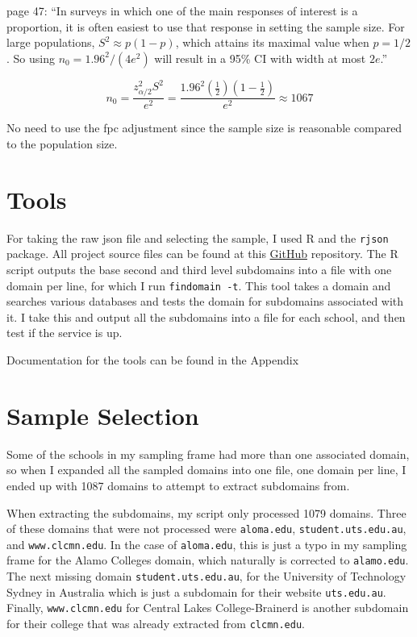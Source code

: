 \documentclass{article}
\theoremstyle{definition}
\begin{document}
\begin{flushleft}
\cite{lohr2019} page 47:
``In surveys in which one of the main responses of interest
is a proportion, it is often easiest to use that response
in setting the sample size.
For large populations, $S^2 \approx p(1-p)$, which
attains its maximal value when $p=1/2$. So using
$n_0=1.96^2/(4e^2)$ will result in a 95\% CI with width at most
$2e$.''

$$
	n_0
	=
	\frac{
		z^2_{\alpha/2}S^2
	}{
		e^2
	}
	=
	\frac{
		1.96^2(\frac{1}{2})(1-\frac{1}{2})
	}{
		e^2
	}
	\approx
	1067
$$

No need to use the fpc adjustment since the sample size
is reasonable compared to the population size.

\section{Tools} \label{sec:tools}
For taking the raw json file and selecting the sample, I used R and the \texttt{rjson}
package. All project source files can be found at this
\href{https://github.com/chrissobczak/os-survey}{GitHub} repository.
The R script outputs the base second and third level subdomains
into a file with one domain per line, for which I run \texttt{findomain -t}.
This tool takes a domain and searches various databases and tests the domain
for subdomains associated with it. I take this and output all the subdomains
into a file for each school, and then test if the service is up.

Documentation for the tools can be found in the Appendix

\section{Sample Selection}
Some of the schools in my sampling frame had more than one associated
domain, so when I expanded all the sampled domains into one file, one
domain per line, I ended up with 1087 domains to attempt to extract
subdomains from.

When extracting the subdomains, my script only processed 1079 domains.
Three of these domains that were not processed were \texttt{aloma.edu},
\texttt{student.uts.edu.au}, and \texttt{www.clcmn.edu}. In the case of
\texttt{aloma.edu}, this is just a typo in my sampling frame for the
Alamo Colleges domain, which naturally is corrected to \texttt{alamo.edu}.
The next missing domain \texttt{student.uts.edu.au}, for the University
of Technology Sydney in Australia which is just a subdomain for their
website \texttt{uts.edu.au}. Finally, \texttt{www.clcmn.edu} for
Central Lakes College-Brainerd is another subdomain for their college
that was already extracted from \texttt{clcmn.edu}.


\end{flushleft}
\end{document}
